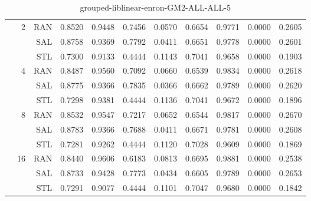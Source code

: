 \begin{center}
\begin{table}[htbp]
\begin{center}
\begin{tabular}{ | r | r | r | r | r | r | r | r | r | r | r |}
 & \multirow{3}{*}{2} & RAN & 0.8520 & 0.9448 & 0.7456 & 0.0570 & 0.6654 & 0.9771 & 0.0000 & 0.2605\\ \cline{3-11}
 &   & SAL & 0.8758 & 0.9369 & 0.7792 & 0.0411 & 0.6651 & 0.9778 & 0.0000 & 0.2601\\ \cline{3-11}
 &   & STL & 0.7300 & 0.9133 & 0.4444 & 0.1143 & 0.7041 & 0.9658 & 0.0000 & 0.1903\\ \cline{2-11}
 & \multirow{3}{*}{4} & RAN & 0.8487 & 0.9560 & 0.7092 & 0.0660 & 0.6539 & 0.9834 & 0.0000 & 0.2618\\ \cline{3-11}
 &   & SAL & 0.8775 & 0.9366 & 0.7835 & 0.0366 & 0.6662 & 0.9789 & 0.0000 & 0.2620\\ \cline{3-11}
 &   & STL & 0.7298 & 0.9381 & 0.4444 & 0.1136 & 0.7041 & 0.9672 & 0.0000 & 0.1896\\ \cline{2-11}
 & \multirow{3}{*}{8} & RAN & 0.8532 & 0.9547 & 0.7217 & 0.0652 & 0.6544 & 0.9817 & 0.0000 & 0.2670\\ \cline{3-11}
 &   & SAL & 0.8783 & 0.9366 & 0.7688 & 0.0411 & 0.6671 & 0.9781 & 0.0000 & 0.2608\\ \cline{3-11}
 &   & STL & 0.7281 & 0.9262 & 0.4444 & 0.1120 & 0.7028 & 0.9609 & 0.0000 & 0.1869\\ \cline{2-11}
 & \multirow{3}{*}{16} & RAN & 0.8440 & 0.9606 & 0.6183 & 0.0813 & 0.6695 & 0.9881 & 0.0000 & 0.2538\\ \cline{3-11}
 &   & SAL & 0.8733 & 0.9428 & 0.7773 & 0.0434 & 0.6605 & 0.9789 & 0.0000 & 0.2653\\ \cline{3-11}
 &   & STL & 0.7291 & 0.9077 & 0.4444 & 0.1101 & 0.7047 & 0.9680 & 0.0000 & 0.1842\\ \cline{2-11}
\hline
\end{tabular}
\caption{grouped-liblinear-enron-GM2-ALL-ALL-5}
\end{center}
 \end{table}
\end{center}

